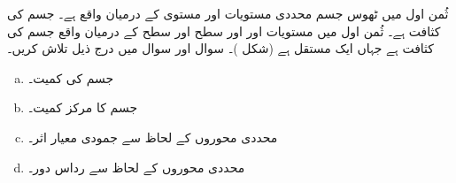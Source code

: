 ثُمن اول میں  ٹھوس جسم   محددی مستویات اور مستوی      کے درمیان واقع ہے۔  جسم کی کثافت  ہے۔
ثُمن اول میں مستویات  اور   اور سطح  اور سطح  کے درمیان واقع  جسم کی کثافت  ہے  جہاں  ایک مستقل ہے (شکل )۔
سوال  اور سوال  میں درج ذیل تلاش کریں۔
\begin{enumerate}[a.]
\item
 جسم کی کمیت۔
\item
 جسم کا مرکز کمیت۔
\item
محددی محوروں کے لحاظ سے جمودی معیار اثر۔
\item
محددی محوروں کے لحاظ سے رداس دور۔
\end{enumerate}

